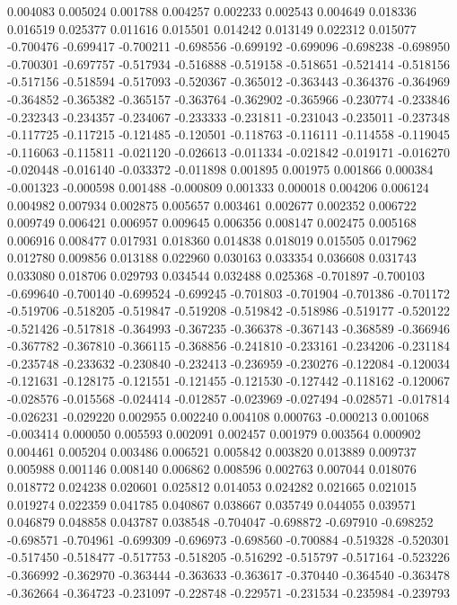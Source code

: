 0.004083
0.005024
0.001788
0.004257
0.002233
0.002543
0.004649
0.018336
0.016519
0.025377
0.011616
0.015501
0.014242
0.013149
0.022312
0.015077
-0.700476
-0.699417
-0.700211
-0.698556
-0.699192
-0.699096
-0.698238
-0.698950
-0.700301
-0.697757
-0.517934
-0.516888
-0.519158
-0.518651
-0.521414
-0.518156
-0.517156
-0.518594
-0.517093
-0.520367
-0.365012
-0.363443
-0.364376
-0.364969
-0.364852
-0.365382
-0.365157
-0.363764
-0.362902
-0.365966
-0.230774
-0.233846
-0.232343
-0.234357
-0.234067
-0.233333
-0.231811
-0.231043
-0.235011
-0.237348
-0.117725
-0.117215
-0.121485
-0.120501
-0.118763
-0.116111
-0.114558
-0.119045
-0.116063
-0.115811
-0.021120
-0.026613
-0.011334
-0.021842
-0.019171
-0.016270
-0.020448
-0.016140
-0.033372
-0.011898
0.001895
0.001975
0.001866
0.000384
-0.001323
-0.000598
0.001488
-0.000809
0.001333
0.000018
0.004206
0.006124
0.004982
0.007934
0.002875
0.005657
0.003461
0.002677
0.002352
0.006722
0.009749
0.006421
0.006957
0.009645
0.006356
0.008147
0.002475
0.005168
0.006916
0.008477
0.017931
0.018360
0.014838
0.018019
0.015505
0.017962
0.012780
0.009856
0.013188
0.022960
0.030163
0.033354
0.036608
0.031743
0.033080
0.018706
0.029793
0.034544
0.032488
0.025368
-0.701897
-0.700103
-0.699640
-0.700140
-0.699524
-0.699245
-0.701803
-0.701904
-0.701386
-0.701172
-0.519706
-0.518205
-0.519847
-0.519208
-0.519842
-0.518986
-0.519177
-0.520122
-0.521426
-0.517818
-0.364993
-0.367235
-0.366378
-0.367143
-0.368589
-0.366946
-0.367782
-0.367810
-0.366115
-0.368856
-0.241810
-0.233161
-0.234206
-0.231184
-0.235748
-0.233632
-0.230840
-0.232413
-0.236959
-0.230276
-0.122084
-0.120034
-0.121631
-0.128175
-0.121551
-0.121455
-0.121530
-0.127442
-0.118162
-0.120067
-0.028576
-0.015568
-0.024414
-0.012857
-0.023969
-0.027494
-0.028571
-0.017814
-0.026231
-0.029220
0.002955
0.002240
0.004108
0.000763
-0.000213
0.001068
-0.003414
0.000050
0.005593
0.002091
0.002457
0.001979
0.003564
0.000902
0.004461
0.005204
0.003486
0.006521
0.005842
0.003820
0.013889
0.009737
0.005988
0.001146
0.008140
0.006862
0.008596
0.002763
0.007044
0.018076
0.018772
0.024238
0.020601
0.025812
0.014053
0.024282
0.021665
0.021015
0.019274
0.022359
0.041785
0.040867
0.038667
0.035749
0.044055
0.039571
0.046879
0.048858
0.043787
0.038548
-0.704047
-0.698872
-0.697910
-0.698252
-0.698571
-0.704961
-0.699309
-0.696973
-0.698560
-0.700884
-0.519328
-0.520301
-0.517450
-0.518477
-0.517753
-0.518205
-0.516292
-0.515797
-0.517164
-0.523226
-0.366992
-0.362970
-0.363444
-0.363633
-0.363617
-0.370440
-0.364540
-0.363478
-0.362664
-0.364723
-0.231097
-0.228748
-0.229571
-0.231534
-0.235984
-0.239793
